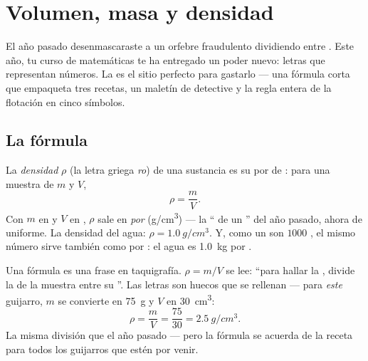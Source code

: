 \chapter{Volumen, masa y densidad}\label{ch:g7:volume-mass-density}

El año pasado desenmascaraste a un orfebre fraudulento dividiendo
 entre . Este año, tu curso de
matemáticas te ha entregado un poder nuevo: letras que representan
números. La  es el sitio perfecto para gastarlo --- una
fórmula corta que empaqueta tres recetas, un maletín de detective y la
regla entera de la flotación en cinco símbolos.

\section{La fórmula}

\begin{definition}\label{def:g7:volume-mass-density:formula}
La \emph{densidad} $\rho$ (la letra griega
\emph{ro}) de una sustancia es su  por  de
: para una muestra de  $m$ y  $V$,
\[
\rho = \frac{m}{V}.
\]
Con $m$ en  y $V$ en , $\rho$ sale
en \emph{ por } (\unit{g/cm^3}) ---
la `` de un '' del año pasado, ahora de
uniforme. La densidad del agua: $\rho = \qty{1.0}{g/cm^3}$. Y, como un
 son $1000$ , el mismo número sirve
también como  por : el agua es \qty{1.0}{kg}
por .
\end{definition}

\begin{example}\label{ex:g7:volume-mass-density:reading}
Una fórmula es una frase en taquigrafía. $\rho = m/V$ se lee: ``para
hallar la , divide la  de la muestra entre su
''. Las letras son huecos que se rellenan --- para
\emph{este} guijarro, $m$ se convierte en \qty{75}{g} y $V$ en
\qty{30}{cm^3}:
\[
\rho = \frac{m}{V} = \frac{75}{30} = \qty{2.5}{g/cm^3}.
\]
La misma división que el año pasado --- pero la fórmula se acuerda de
la receta para todos los guijarros que estén por venir.
\end{example}

